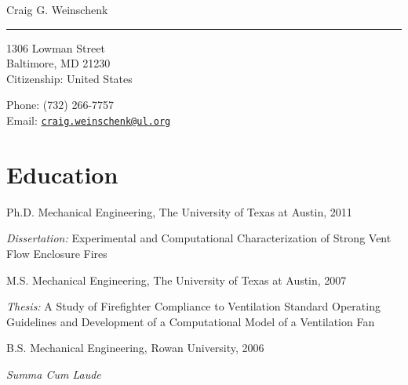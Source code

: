 \documentclass[10pt,letterpaper]{article}
\def\name{Craig G. Weinschenk}
\renewenvironment{itemize}{
  \begin{list}{}{
    \setlength{\leftmargin}{1.5em}
  }
}{
  \end{list}
}
\begin{document}
{\huge \name} \\
\noindent\rule{17cm}{0.4pt}


\vspace{0.25in}

\begin{minipage}[t]{0.5\textwidth}
  1306 Lowman Street \\
  Baltimore, MD  21230\\
  Citizenship: United States
\end{minipage}
\begin{minipage}[t]{0.5\textwidth}
  Phone: (732) 266-7757 \\
  Email: \href{mailto:craig.weinschenk@ul.com} {\tt craig.weinschenk@ul.org}\\

\end{minipage}

\section*{Education}

\begin{itemize}
  \item Ph.D. Mechanical Engineering, The University of Texas at Austin, 2011
    \begin{itemize}
      \item \textit{Dissertation:} Experimental and Computational Characterization of Strong Vent Flow Enclosure Fires
    \end{itemize}

  \item M.S. Mechanical Engineering, The University of Texas at Austin, 2007
    \begin{itemize}
      \item \textit{Thesis:} A Study of Firefighter Compliance to Ventilation Standard Operating Guidelines and Development of a Computational Model of a Ventilation Fan
    \end{itemize}

  \item B.S. Mechanical Engineering, Rowan University, 2006
  \begin{itemize}
    \item \textit{Summa Cum Laude}
  \end{itemize}
\end{itemize}
\end{document}
